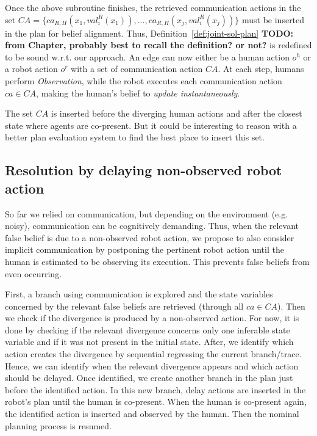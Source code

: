 {Once the above subroutine finishes, the retrieved communication actions in the set $\mathit{CA} = \{ ca_{R, H}(x_1,val^R_i(x_1)),..., ca_{R, H}(x_j,val^R_i(x_j)) \}$ must be inserted in the plan for belief alignment. Thus, Definition~\ref{def:joint-sol-plan} \textbf{TODO: from Chapter, probably best to recall the definition? or not?} is redefined to be sound w.r.t. our approach. An edge can now either be a human action $o^h$ or a robot action $o^r$ with a set of communication action $CA$.
At each step, humans perform \textit{Observation}, while the robot executes each communication action $ca \in \mathit{CA}$, making the human's belief to \textit{update instantaneously}.

The set $\mathit{CA}$ is inserted before the diverging human actions and after the closest state where agents are co-present. 
But it could be interesting to reason with a better plan evaluation system to find the best place to insert this set.

    \subsection{Resolution by delaying non-observed robot action}

So far we relied on communication, but depending on the environment (e.g. noisy), communication can be cognitively demanding. 
Thus, when the relevant false belief is due to a non-observed robot action, we propose to also consider implicit communication by postponing the pertinent robot action until the human is estimated to be observing its execution. 
This prevents false beliefs from even occurring.

First, a branch using communication is explored and the state variables concerned by the relevant false beliefs are retrieved (through all $ca \in CA$).
Then we check if the divergence is produced by a non-observed action. For now, it is done by checking if the relevant divergence concerns only one inferable state variable and if it was not present in the initial state.   
After, we identify which action creates the divergence by sequential regressing the current branch/trace. Hence, we can identify when the relevant divergence appears and which action should be delayed.
Once identified, we create another branch in the plan just before the identified action. In this new branch, {\sc delay} actions are inserted in the robot's plan until the human is co-present. When the human is co-present again, the identified action is inserted and observed by the human. Then the nominal planning process is resumed.  

}
